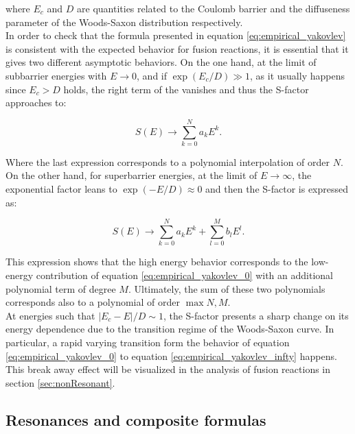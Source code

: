 \documentclass[openany]{book}
\begin{document}
where $E_c$ and $D$ are quantities related to the Coulomb barrier and the diffuseness parameter of the Woods-Saxon distribution respectively. \\

In order to check that the formula presented in equation \ref{eq:empirical_yakovlev} is consistent with the expected behavior for fusion reactions, it is essential that it gives two different asymptotic behaviors. On the one hand, at the limit of subbarrier energies with $E \rightarrow 0 $, and if $\exp {(E_c/D)} \gg 1$, as it usually happens since $E_c > D$ holds, the right term of the  vanishes and thus the S-factor approaches to: 

\begin{equation} \label{eq:empirical_yakovlev_0}
	S(E) \rightarrow \sum_{k=0}^{N} {a_kE^k}. 
\end{equation}

Where the last expression corresponds to a polynomial interpolation of order $N$. On the other hand, for superbarrier energies, at the limit of $E \rightarrow \infty $, the exponential factor leans to $\exp {(-E/D)} \approx 0$ and then the S-factor is expressed as: 


\begin{equation} \label{eq:empirical_yakovlev_infty}
	S(E) \rightarrow \sum_{k=0}^{N} {a_kE^k} + \sum_{l=0}^{M} {b_lE^l}.
\end{equation}

This expression shows that the high energy behavior corresponds to the low-energy contribution of equation \ref{eq:empirical_yakovlev_0} with an additional polynomial term of degree $M$. Ultimately, the sum of these two polynomials corresponds also to a polynomial of order $\max{N, M}$. \\

At energies such that $|E_c - E|/D \sim 1$, the S-factor presents a sharp change on its energy dependence due to the transition regime of the Woods-Saxon curve. In particular, a rapid varying transition form the behavior of equation \ref{eq:empirical_yakovlev_0} to equation  \ref{eq:empirical_yakovlev_infty} happens. This break away effect will be visualized in the analysis of fusion reactions in section \ref{sec:nonResonant}. 
 
\subsection{Resonances and composite formulas} \label{sub:empirical_resonances}
\end{document}
